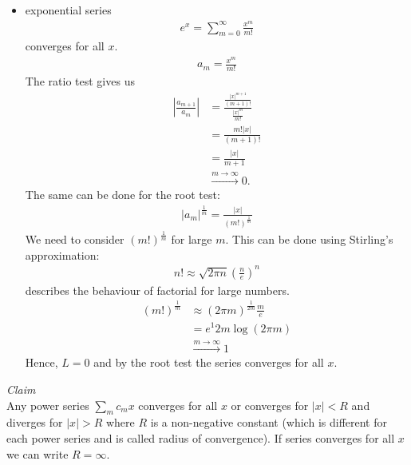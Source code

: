 \begin{ex}
	\begin{itemize}
		\item
	exponential series
	\begin{align*}
	e^x = \sum_{m=0}^\infty \frac{x^m}{m!}
	\end{align*}
	converges for all $x$.
	\begin{align*}
	a_m = \frac{x^m}{m!}
	\end{align*}
	The ratio test gives us
	\begin{align*}
	\left| \frac{a_{m+1}}{a_m} \right| & = \frac{\frac{|x|^{m+1}}{(m+1)!}}{\frac{|x|^m}{m!}} \\
		& = \frac{m!|x|}{(m+1)!} \\
		& = \frac{|x|}{m+1} \\
		& \overset{m \to \infty}{\to} 0.
	\end{align*}
	The same can be done for the root test:
	\begin{align*}
	|a_m|^{\frac 1 m} = \frac{|x|}{(m!)^{\frac 1 m}}
	\end{align*}
	We need to consider $(m!)^{\frac 1 m}$ for large $m$. This can be done using Stirling's approximation:
	\begin{align*}
	n! \approx \sqrt{2 \pi n} \left( \frac n e \right) ^n 
	\end{align*}
	describes the behaviour of factorial for large numbers.
	\begin{align*}
	(m!)^{\frac 1 m} & \approx (2 \pi m)^{\frac 1 {2m}} \frac m e \\
	& = e^{1}{2m} \log(2 \pi m) \\
	& \overset{m \to \infty}{\to} 1
	\end{align*}
	Hence, $L=0$ and by the root test the series converges for all $x$.
	\end{itemize}
\end{ex}

\emph{Claim} \\
Any power series $\sum_m c_m x$ converges for all $x$ or converges for $|x|<R$ and diverges for $|x|>R$ where $R$ is a non-negative constant (which is different for each power series and is called radius of convergence). If series converges for all $x$ we can write $R = \infty$.

